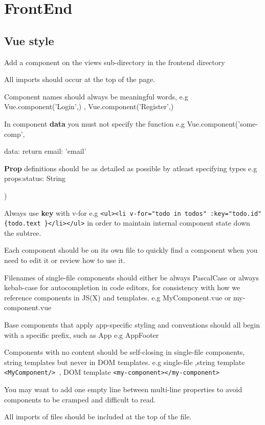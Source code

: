 \documentclass{article}
\begin{document}
\section{FrontEnd}
    \subsection{Vue style}
            
        \begin{enumerate}
            
            \item Add a component on the views sub-directory in the frontend directory
            \item All imports should occur at the top of the page.
            \item Component names should always be meaningful words, e.g Vue.component('Login',{}) , Vue.component('Register',{})
            \item In component \textbf{data} you must not specify the function e.g Vue.component('some-comp', {data:  {return { email: 'email'}}
            \item \textbf{Prop} definitions should be as detailed as possible by atleast specifying types e.g props:{status: String}})
            \item Always use \textbf{key} with v-for e.g \texttt{<ul><li v-for="todo in todos" :key="todo.id" \{{todo.text }\}</li></ul>} in order to maintain internal component state down the subtree.
            \item  Each component should be on its own file to quickly find a component when you need to edit it or review how to use it.
            \item Filenames of single-file components should either be always PascalCase or always kebab-case for autocompletion in code editors, for consistency with how we reference components in JS(X) and templates. e.g MyComponent.vue or my-component.vue
            
            \item Base components that apply app-specific styling and conventions should all begin with a specific prefix, such as App e.g AppFooter
            \item Components with no content should be self-closing in single-file components, string templates but never in DOM templates.
            e.g single-file ,string template \texttt{<MyComponent/> }, DOM template \texttt{<my-component></my-component>}
            
            \item You may want to add one empty line between multi-line properties to avoid components to be cramped and difficult to read.
            
            \item All imports of files should be included at the top of the file.
            
        \end{enumerate}
        
\end{document}
